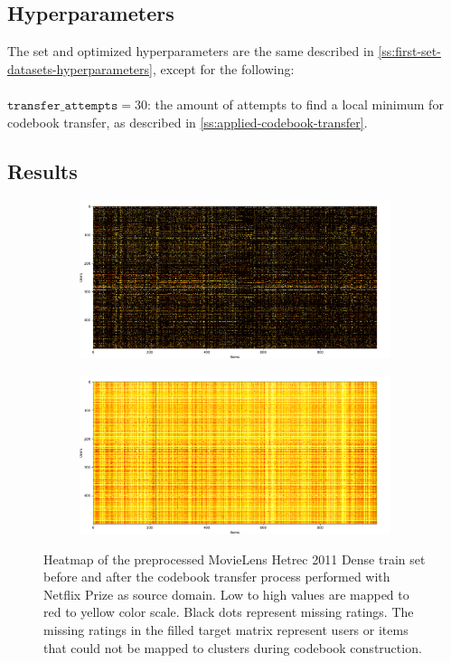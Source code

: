 \subsection{Hyperparameters}

The set and optimized hyperparameters are the same described in \autoref{ss:first-set-datasets-hyperparameters}, except for the following:\\\\
$\texttt{transfer\_attempts} = 30$: the amount of attempts to find a local minimum for codebook transfer, as described in \autoref{ss:applied-codebook-transfer}.

\clearpage


\subsection{Results}

\vspace*{\fill}
\begin{figure}[hbt!]
\centering
\begin{subfigure}{\textwidth}
\includegraphics[width=\textwidth]{pictures/movielens-target}
\end{subfigure}
\begin{subfigure}{\textwidth}
\includegraphics[width=\textwidth]{pictures/movielens-target-filled}
\end{subfigure}
\caption{Heatmap of the preprocessed MovieLens Hetrec 2011 Dense train set before and after the codebook transfer process performed with Netflix Prize as source domain. Low to high values are mapped to red to yellow color scale. Black dots represent missing ratings. The missing ratings in the filled target matrix represent users or items that could not be mapped to clusters during codebook construction.}
\end{figure}
\vspace*{\fill}

